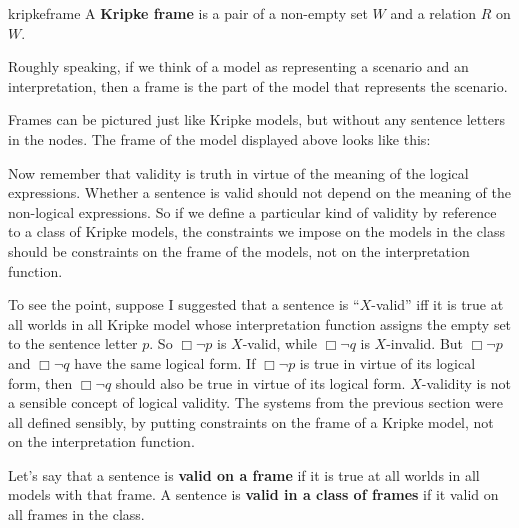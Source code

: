 \begin{definition}{}{kripkeframe}
  A \textbf{Kripke frame} is a pair of a non-empty set $W$ and a relation $R$ on $W$.
\end{definition}

Roughly speaking, if we think of a model as representing a scenario and an
interpretation, then a frame is the part of the model that represents the
scenario.


Frames can be pictured just like Kripke models, but without any sentence letters
in the nodes. The frame of the model displayed above looks like this:
\begin{center}
\end{center}

Now remember that validity is truth in virtue of the meaning of the logical
expressions. Whether a sentence is valid should not depend on the
meaning of the non-logical expressions. So if we define a particular kind of
validity by reference to a class of Kripke models, the constraints we impose on
the models in the class should be constraints on the frame of the models, not on
the interpretation function.

To see the point, suppose I suggested that a sentence is ``$X$-valid'' iff it is true
at all worlds in all Kripke model whose interpretation function assigns the
empty set to the sentence letter $p$. So $\Box \neg p$ is $X$-valid, while
$\Box \neg q$ is $X$-invalid. But $\Box \neg p$ and $\Box \neg q$ have the same
logical form. If $\Box \neg p$ is true in virtue of its logical form, then
$\Box \neg q$ should also be true in virtue of its logical form. $X$-validity is
not a sensible concept of logical validity. The systems from the previous
section were all defined sensibly, by putting constraints on the frame of a
Kripke model, not on the interpretation function.

Let's say that a sentence is \textbf{valid on a frame} if it is true at all
worlds in all models with that frame. A sentence is \textbf{valid in a class of
  frames} if it valid on all frames in the class.

